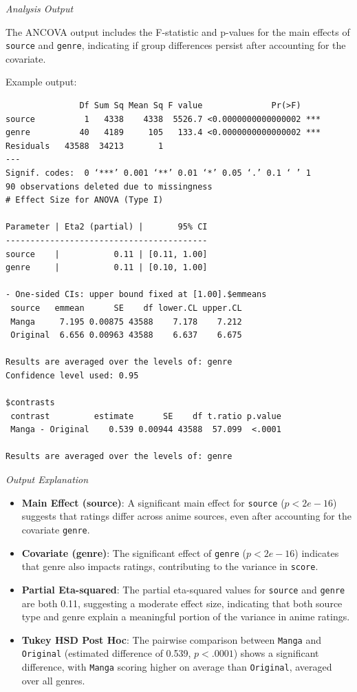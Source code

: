 \documentclass[
]{book}
\providecommand{\tightlist}{%
  \setlength{\itemsep}{0pt}\setlength{\parskip}{0pt}}
\begin{document}
\emph{Analysis Output}

The ANCOVA output includes the F-statistic and p-values for the main effects of \texttt{source} and \texttt{genre}, indicating if group differences persist after accounting for the covariate.

Example output:

\begin{verbatim}
               Df Sum Sq Mean Sq F value              Pr(>F)    
source          1   4338    4338  5526.7 <0.0000000000000002 ***
genre          40   4189     105   133.4 <0.0000000000000002 ***
Residuals   43588  34213       1                                
---
Signif. codes:  0 ‘***’ 0.001 ‘**’ 0.01 ‘*’ 0.05 ‘.’ 0.1 ‘ ’ 1
90 observations deleted due to missingness
# Effect Size for ANOVA (Type I)

Parameter | Eta2 (partial) |       95% CI
-----------------------------------------
source    |           0.11 | [0.11, 1.00]
genre     |           0.11 | [0.10, 1.00]

- One-sided CIs: upper bound fixed at [1.00].$emmeans
 source   emmean      SE    df lower.CL upper.CL
 Manga     7.195 0.00875 43588    7.178    7.212
 Original  6.656 0.00963 43588    6.637    6.675

Results are averaged over the levels of: genre 
Confidence level used: 0.95 

$contrasts
 contrast         estimate      SE    df t.ratio p.value
 Manga - Original    0.539 0.00944 43588  57.099  <.0001

Results are averaged over the levels of: genre 
\end{verbatim}

\emph{Output Explanation}

\begin{itemize}
\tightlist
\item
  \textbf{Main Effect (source)}: A significant main effect for \texttt{source} (\(p < 2e-16\)) suggests that ratings differ across anime sources, even after accounting for the covariate \texttt{genre}.
\item
  \textbf{Covariate (genre)}: The significant effect of \texttt{genre} (\(p < 2e-16\)) indicates that genre also impacts ratings, contributing to the variance in \texttt{score}.
\item
  \textbf{Partial Eta-squared}: The partial eta-squared values for \texttt{source} and \texttt{genre} are both 0.11, suggesting a moderate effect size, indicating that both source type and genre explain a meaningful portion of the variance in anime ratings.
\item
  \textbf{Tukey HSD Post Hoc}: The pairwise comparison between \texttt{Manga} and \texttt{Original} (estimated difference of 0.539, \(p < .0001\)) shows a significant difference, with \texttt{Manga} scoring higher on average than \texttt{Original}, averaged over all genres.
\end{itemize}
\end{document}
